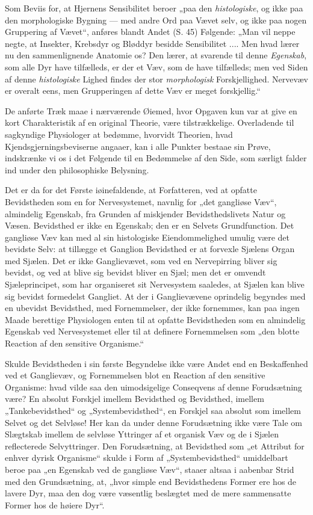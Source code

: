 \documentclass[12pt,a4paper]{book}
\begin{document}
Som Beviis for, at Hjernens Sensibilitet beroer „paa den
\emph{histologiske}, og ikke paa den morphologiske Bygning --- med andre
Ord paa Vævet selv, og ikke paa nogen Gruppering af Vævet“, anføres
blandt Andet (S. 45) Følgende: „Man vil neppe negte, at Insekter,
Krebsdyr og Bløddyr besidde Sensibilitet .... Men hvad lærer nu den
sammenlignende Anatomie os? Den lærer, at svarende til denne
\emph{Egenskab}, som alle Dyr have tilfælleds, er der et Væv, som de have
tilfælleds; men ved Siden af denne \emph{histologiske} Lighed findes der
stor \emph{morphologisk} Forskjellighed. Nervevæv er overalt eens, men
Grupperingen af dette Væv er meget forskjellig.“

De anførte Træk maae i nærværende Øiemed, hvor Opgaven kun var at give
en kort Charakteristik af en original Theorie, være tilstrækkelige.
Overladende til sagkyndige Physiologer at bedømme, hvorvidt Theorien,
hvad Kjendsgjerningsbeviserne angaaer, kan i alle Punkter bestaae sin
Prøve, indskrænke vi os i det Følgende til en Bedømmelse af den Side, som
særligt falder ind under den philosophiske Belysning.

Det er da for det Første iøinefaldende, at Forfatteren, ved at opfatte
Bevidstheden som en for Nervesystemet, navnlig for „det gangliøse Væv“,
almindelig Egenskab, fra Grunden af miskjender Bevidsthedslivets Natur og
Væsen. Bevidsthed er ikke en Egenskab; den er en Selvets Grundfunction.
Det
gangliøse Væv kan med al sin histologiske Eiendommelighed umulig være det
bevidste Selv: at tillægge et Ganglion Bevidsthed er at forvexle Sjælens
Organ med Sjælen. Det er ikke Ganglievævet, som ved en Nervepirring
bliver sig bevidst, og ved at blive sig bevidst bliver en Sjæl; men det
er omvendt Sjæleprincipet, som har organiseret sit Nervesystem saaledes,
at Sjælen kan blive sig bevidst formedelst Gangliet. At der i
Ganglievævene oprindelig begyndes med en ubevidst Bevidsthed, med
Fornemmelser, der ikke fornemmes, kan paa ingen Maade berettige
Physiologen enten til at opfatte Bevidstheden som en almindelig Egenskab
ved Nervesystemet eller til at definere Fornemmelsen som „den blotte
Reaction af den sensitive Organisme.“

Skulde Bevidstheden i sin første Begyndelse ikke være Andet end en
Beskaffenhed ved et Ganglievæv, og Fornemmelsen blot en Reaction af den
sensitive Organisme: hvad vilde saa den uimodsigelige Conseqvens af denne
Forudsætning være? En absolut Forskjel imellem Bevidsthed og Bevidsthed,
imellem „Tankebevidsthed“ og „Systembevidsthed“, en Forskjel saa absolut
som imellem Selvet og det Selvløse! Her kan da under denne Forudsætning
ikke være Tale om Slægtskab imellem de selvløse Yttringer af et organisk
Væv og de i Sjælen reflecterede Selvyttringer. Den Forudsætning, at
Bevidsthed som „et Attribut for enhver dyrisk Organisme“ skulde i Form af
„Systembevidsthed“ umiddelbart beroe paa „en Egenskab ved de gangliøse
Væv“, staaer altsaa i aabenbar Strid med den Grundsætning, at, „hvor
simple end Bevidsthedens Former ere hos de lavere Dyr, maa den dog være
væsentlig beslægtet med de mere sammensatte Former hos de høiere Dyr“.
\end{document}
